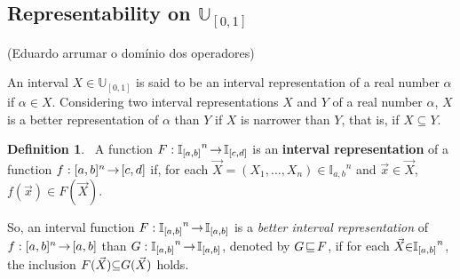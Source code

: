 \documentclass[12pt]{article}
\theoremstyle{plain}
\theoremstyle{remark}
\theoremstyle{definition}
\newtheorem{definition}[theorem]{Definition}
\theoremstyle{proposition}
\newcommand{\lra}{\hspace{-0.05cm}\rightarrow\hspace{-0.05cm}}
\newcommand{\II}{\mathbb{I} }
\newcommand{\UU}{\mathbb{U} }
\begin{document}

\subsection{Representability on $\mathbb{U}_{[0,1]}$} (Eduardo   arrumar o domínio dos operadores) 

An interval $X \in \UU_{[0,1]}$ is said to be an interval representation of a real number $\alpha$ if $\alpha \in X$.
Considering two interval representations $X$ and $Y$ of a real number $\alpha$,  $X$ is a better representation of
$\alpha$ than $Y$ if $X$ is narrower than $Y$, that is,  if $X\subseteq Y$.

\begin{definition}~\cite[Section 1]{SBA06}\label{d1} A function $F:{\mathbb{I}_{[a,b]}}^n\lra \mathbb{I}_{[c,d]}$ is an \textbf{interval
representation} of a function $f:[a,b]^n\lra [c,d]$ if, for each
$\vec{X}= (X_1, \ldots, X_n)\in {\mathbb{I}_{a,b}}^n$ and $\vec{x}\in \vec{X}$, $f(\vec{x})\in
F(\vec{X})$.
\end{definition}

So, an interval function $F:{\mathbb{I}_{[a,b]}}^n\lra \mathbb{I}_{[a,b]}$ is a \emph{better
interval representation} of $f:[a,b]^n\lra [a,b]$ than $G:{\mathbb{I}_{[a,b]}}^n\lra \mathbb{I}_{[a,b]}$, denoted by $G\hspace{-0.05cm}\sqsubseteq\hspace{-0.05cm}
F$, if for each $\vec{X}\hspace{-0.1cm}\in\hspace{-0.1cm}{\mathbb{I}_{[a,b]}}^n$, the inclusion $F(\vec{X})\hspace{-0.1cm}\subseteq\hspace{-0.1cm}G(\vec{X})$ holds.
\end{document}
